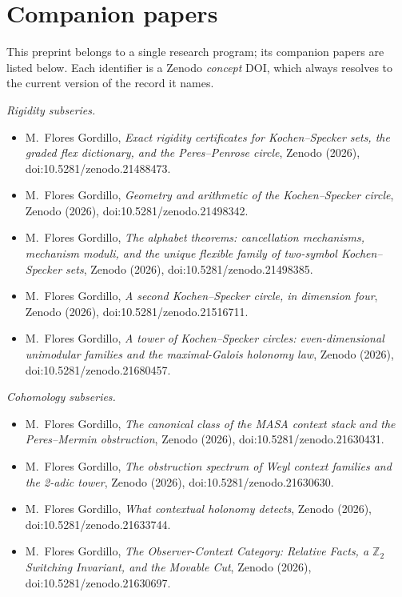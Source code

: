 \documentclass[11pt]{article}
\theoremstyle{definition}
\theoremstyle{remark}
\begin{document}
\section*{Companion papers}
This preprint belongs to a single research program; its companion papers are
listed below. Each identifier is a Zenodo \emph{concept} DOI, which always
resolves to the current version of the record it names.

\noindent\emph{Rigidity subseries.}
\begin{itemize}
\item M.~Flores Gordillo, \emph{Exact rigidity certificates for Kochen--Specker sets, the graded flex dictionary, and the Peres--Penrose circle}, Zenodo (2026), doi:10.5281/zenodo.21488473.
\item M.~Flores Gordillo, \emph{Geometry and arithmetic of the Kochen--Specker circle}, Zenodo (2026), doi:10.5281/zenodo.21498342.
\item M.~Flores Gordillo, \emph{The alphabet theorems: cancellation mechanisms, mechanism moduli, and the unique flexible family of two-symbol Kochen--Specker sets}, Zenodo (2026), doi:10.5281/zenodo.21498385.
\item M.~Flores Gordillo, \emph{A second Kochen--Specker circle, in dimension four}, Zenodo (2026), doi:10.5281/zenodo.21516711.
\item M.~Flores Gordillo, \emph{A tower of Kochen--Specker circles: even-dimensional unimodular families and the maximal-Galois holonomy law}, Zenodo (2026), doi:10.5281/zenodo.21680457.
\end{itemize}

\noindent\emph{Cohomology subseries.}
\begin{itemize}
\item M.~Flores Gordillo, \emph{The canonical class of the MASA context stack and the Peres--Mermin obstruction}, Zenodo (2026), doi:10.5281/zenodo.21630431.
\item M.~Flores Gordillo, \emph{The obstruction spectrum of Weyl context families and the 2-adic tower}, Zenodo (2026), doi:10.5281/zenodo.21630630.
\item M.~Flores Gordillo, \emph{What contextual holonomy detects}, Zenodo (2026), doi:10.5281/zenodo.21633744.
\item M.~Flores Gordillo, \emph{The Observer-Context Category: Relative Facts, a $\mathbb{Z}_2$ Switching Invariant, and the Movable Cut}, Zenodo (2026), doi:10.5281/zenodo.21630697.
\end{itemize}
\end{document}

